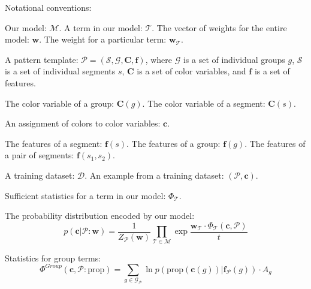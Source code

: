 
\newcommand{\pattern}{\mathcal{P}}
\newcommand{\group}{g}
\newcommand{\groups}{\mathcal{G}}
\newcommand{\segment}{s}
\newcommand{\segments}{\mathcal{S}}
\newcommand{\model}{\mathcal{M}}
\newcommand{\term}{\mathcal{T}}
\newcommand{\weights}{\mathbf{w}}
\newcommand{\dataset}{\mathcal{D}}
\newcommand{\variable}[1]{\mathbf{#1}}
\newcommand{\colorVars}{\variable{C}}
\newcommand{\colors}{\variable{c}}
\newcommand{\features}{\variable{f}}
\newcommand{\termStats}{\Phi_\term}
\newcommand{\expectation}{\mathds{E}}

\newcommand{\groupTerm}{\Phi^{Group}}
\newcommand{\segTerm}{\Phi^{Seg}}
\newcommand{\adjTerm}{\Phi^{Adj}}
\newcommand{\prop}{\text{prop}}
\newcommand{\neighbors}{n}
\newcommand{\adjStrength}{\text{str}}
\newcommand{\size}{A}

Notational conventions:

Our model: $\model$. A term in our model: $\term$. The vector of weights for the entire model: $\weights$. The weight for a particular term: $\weights_\term$.

A pattern template: $\pattern = (\segments, \groups, \colorVars, \features)$, where $\groups$ is a set of individual groups $\group$, $\segments$ is a set of individual segments $\segment$, $\colorVars$ is a set of color variables, and $\features$ is a set of features.

The color variable of a group: $\colorVars(\group)$. The color variable of a segment: $\colorVars(\segment)$.

An assignment of colors to color variables: $\colors$.

The features of a segment: $\features(\segment)$. The features of a group: $\features(\group)$. The features of a pair of segments: $\features(\segment_1, \segment_2)$.

A training dataset: $\dataset$. An example from a training dataset: $(\pattern, \colors)$.

Sufficient statistics for a term in our model: $\termStats$.

The probability distribution encoded by our model:
\begin{equation*}
p(\colors | \pattern : \weights) = \frac{1}{Z_\pattern(\weights)} \prod_{\term \in \model} \exp{\frac{ \weights_\term \cdot \termStats(\colors, \pattern)}{t}}
\end{equation*}

Statistics for group terms:
\begin{equation*}
\groupTerm(\colors, \pattern : \prop) = \sum_{\group \in \groups_\pattern} \ln p( \prop( \colors(\group) ) | \features_\pattern(\group)) \cdot \size_\group
\end{equation*}

